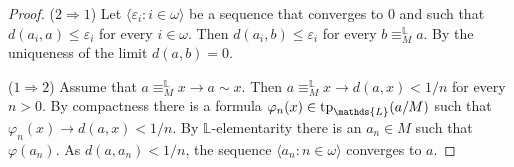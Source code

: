 \documentclass[11pt,oneside]{amsart}
\theoremstyle{plain}
\theoremstyle{remark}
\begin{document}
\begin{proof}
  ($2\Rightarrow1$) Let  $\langle \varepsilon_i: i\in\omega\rangle$ be a sequence that converges to $0$ and such that $d(a_i,a)\le\varepsilon_i$ for every $i\in\omega$.
  Then $d(a_i,b)\le\varepsilon_i$ for every $b\equiv^\mathds{L}_Ma$.
  By the uniqueness of the limit $d(a,b)=0$.

  ($1\Rightarrow2$) Assume that $a\equiv^\mathds{L}_M x\rightarrow a\sim x$.
  Then $a\equiv^\mathds{L}_M x\rightarrow d(a,x)<1/n$ for every $n>0$.
  By compactness there is a formula $\varphi_n(x)\in{\rm tp}_\mathds{L}(a/M)$ such that $\varphi_n(x)\rightarrow d(a,x)<1/n$.
  By $\mathds{L}$-elementarity there is an $a_n\in M$ such that $\varphi(a_n)$.
  As $d(a,a_n)<1/n$, the sequence $\langle a_n: n\in\omega\rangle$ converges to $a$.
\end{proof}
\end{document}
